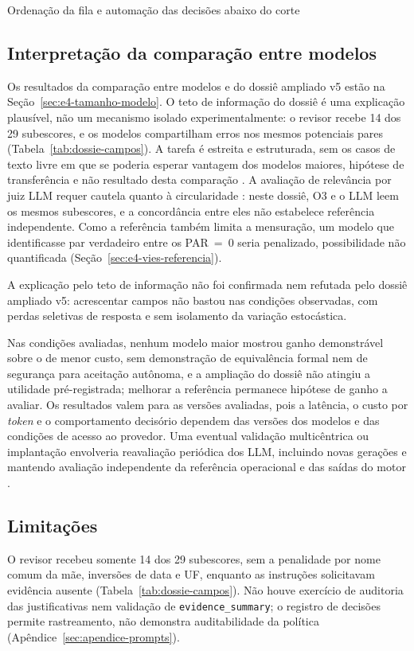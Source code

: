 \begin{chapter}{Ordenação da fila e automação das decisões abaixo do corte}
\subsection{Interpretação da comparação entre modelos}\label{sec:e4-discussao-llm}

Os resultados da comparação entre modelos e do dossiê ampliado v5 estão na Seção~\ref{sec:e4-tamanho-modelo}. O teto de informação do dossiê é uma explicação plausível, não um mecanismo isolado experimentalmente: o revisor recebe 14 dos 29 subescores, e os modelos compartilham erros nos mesmos potenciais pares (Tabela~\ref{tab:dossie-campos}). A tarefa é estreita e estruturada, sem os casos de texto livre em que se poderia esperar vantagem dos modelos maiores, hipótese de transferência e não resultado desta comparação \cite{Ather2026llmlinkage}. A avaliação de relevância por juiz LLM requer cautela quanto à circularidade \cite{Alaofi2026llmrelevance,Gienapp2026relevance}: neste dossiê, O3 e o LLM leem os mesmos subescores, e a concordância entre eles não estabelece referência independente. Como a referência também limita a mensuração, um modelo que identificasse par verdadeiro entre os PAR~=~0 seria penalizado, possibilidade não quantificada (Seção~\ref{sec:e4-vies-referencia}).

A explicação pelo teto de informação não foi confirmada nem refutada pelo dossiê ampliado v5: acrescentar campos não bastou nas condições observadas, com perdas seletivas de resposta e sem isolamento da variação estocástica.

Nas condições avaliadas, nenhum modelo maior mostrou ganho demonstrável sobre o de menor custo, sem demonstração de equivalência formal nem de segurança para aceitação autônoma, e a ampliação do dossiê não atingiu a utilidade pré-registrada; melhorar a referência permanece hipótese de ganho a avaliar. Os resultados valem para as versões avaliadas, pois a latência, o custo por \textit{token} e o comportamento decisório dependem das versões dos modelos e das condições de acesso ao provedor. Uma eventual validação multicêntrica ou implantação envolveria reavaliação periódica dos LLM, incluindo novas gerações e mantendo avaliação independente da referência operacional e das saídas do motor \cite{Jardim2026phdrepo}.

\subsection{Limitações}\label{sec:e4-limitacoes}

O revisor recebeu somente 14 dos 29 subescores, sem a penalidade por nome comum da mãe, inversões de data e UF, enquanto as instruções solicitavam evidência ausente (Tabela~\ref{tab:dossie-campos}). Não houve exercício de auditoria das justificativas nem validação de \texttt{evidence\_summary}; o registro de decisões permite rastreamento, não demonstra auditabilidade da política (Apêndice~\ref{sec:apendice-prompts}).


\end{chapter}
